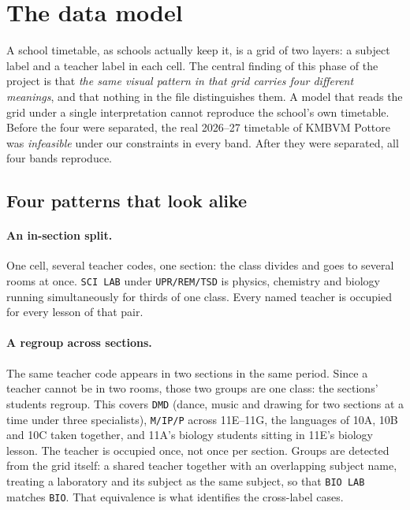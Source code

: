 
\section{The data model}
\label{sec:datamodel}

A school timetable, as schools actually keep it, is a grid of two layers: a subject label and a
teacher label in each cell. The central finding of this phase of the project is that
\emph{the same visual pattern in that grid carries four different meanings}, and that nothing in
the file distinguishes them. A model that reads the grid under a single interpretation cannot
reproduce the school's own timetable. Before the four were separated, the real 2026--27 timetable
of KMBVM Pottore was \emph{infeasible} under our constraints in every band. After they were
separated, all four bands reproduce.

\subsection{Four patterns that look alike}

\paragraph{An in-section split.} One cell, several teacher codes, one section: the class divides
and goes to several rooms at once. \texttt{SCI LAB} under \texttt{UPR/REM/TSD} is physics,
chemistry and biology running simultaneously for thirds of one class. Every named teacher is
occupied for every lesson of that pair.

\paragraph{A regroup across sections.} The same teacher code appears in two sections in the same
period. Since a teacher cannot be in two rooms, those two groups are one class: the sections'
students regroup. This covers \texttt{DMD} (dance, music and drawing for two sections at a time
under three specialists), \texttt{M/IP/P} across 11E--11G, the languages of 10A, 10B and 10C
taken together, and 11A's biology students sitting in 11E's biology lesson. The teacher is
occupied once, not once per section. Groups are detected from the grid itself: a shared teacher
together with an overlapping subject name, treating a laboratory and its subject as the same
subject, so that \texttt{BIO LAB} matches \texttt{BIO}. That equivalence is what identifies the
cross-label cases.

